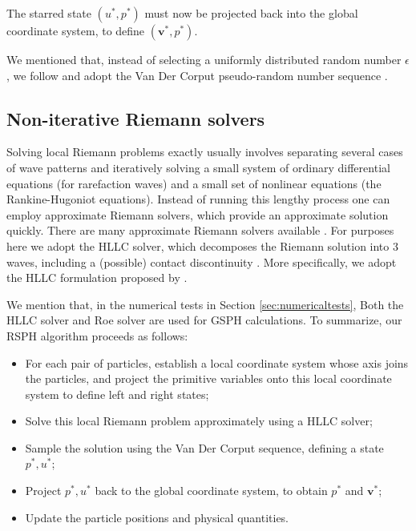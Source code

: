 The starred state $(u^{\ast},  p^{\ast})$ must now be projected back into the global coordinate system, to define  $(\textbf{v}^{\ast},  p^{\ast})$.

We mentioned that, instead of selecting a uniformly distributed random number $\epsilon$, we follow \citet{colella1982glimm} and adopt the Van Der Corput pseudo-random number sequence \citep{hammersley2013monte}.

\subsection{Non-iterative Riemann solvers} \label{sec:RP-solver}
Solving local Riemann problems exactly usually involves separating several cases of wave patterns and iteratively solving a small system of ordinary differential equations (for rarefaction waves) and a small set of nonlinear equations (the Rankine-Hugoniot equations). Instead of running this lengthy process one can employ approximate Riemann solvers, which provide an approximate solution quickly. There are many approximate Riemann solvers available \citep{rider1994review, luo2004computation, puri2014approximate}. For purposes here we adopt the HLLC solver, which decomposes the Riemann solution into 3 waves, including a (possible) contact discontinuity \citep{toro1994restoration}. More specifically, we adopt the HLLC formulation proposed by \citet{luo2004computation}.
 
We mention that, in the numerical tests in Section \ref{sec:numericaltests}, Both the HLLC solver and Roe solver are used for GSPH calculations.
To summarize, our RSPH algorithm proceeds as follows:
\begin{itemize}
\item For each pair of particles, establish a local coordinate system whose axis joins the particles,
and project the primitive variables onto this local coordinate system to define left and right states;
\item Solve this local Riemann problem approximately using a HLLC solver;
\item Sample the solution using the Van Der Corput sequence, defining a state  $p^{\ast}, u^{\ast}$;
\item Project $p^{\ast}, u^{\ast}$  back to the global coordinate system, to obtain $p^{\ast}$ and $\textbf{v}^{\ast}$;
\item Update the particle positions and physical quantities.
\end{itemize}

